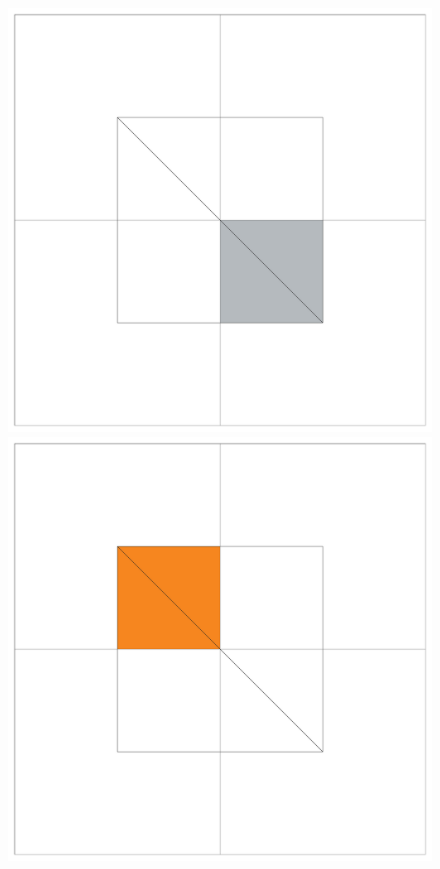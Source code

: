 \begin{figure}[!htb]
  \includegraphics[width=\linewidth]{drawings/examples/cube_example/cubes_06.pdf}
\endminipage\hfill
{}%
  \includegraphics[width=\linewidth]{drawings/examples/cube_example/cubes_03.pdf}
  

\end{figure}
